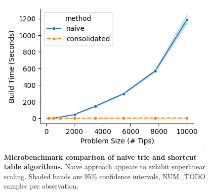\begin{center}
\begin{figure}[h]
\includegraphics[width=\linewidth]{img/time_by_tips.png}
\caption{
\textbf{Microbenchmark comparison of naive trie and shortcut table algorithms.}
\small
Naive approach appears to exhibit superlinear scaling.
Shaded bands are 95\% confidence intervals, NUM\_TODO samples per observation.
}
\label{fig:comparison}
\end{figure}
\end{center}